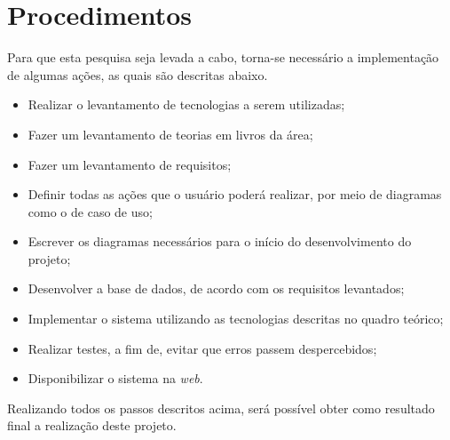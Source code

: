 \section{Procedimentos}

\par Para que esta pesquisa seja levada a cabo, torna-se necessário a implementação de algumas ações, as quais são descritas abaixo.

\begin{itemize}
	\item Realizar o levantamento de tecnologias a serem utilizadas;
	\item Fazer um levantamento de teorias em livros da área;
	\item Fazer um levantamento de requisitos;
	\item Definir todas as ações que o usuário poderá realizar, por meio de diagramas como o de caso de uso;
	\item Escrever os diagramas necessários para o início do desenvolvimento do projeto;
	\item Desenvolver a base de dados, de acordo com os requisitos levantados;
	\item Implementar o sistema utilizando as tecnologias descritas no quadro teórico;
	\item Realizar testes, a fim de, evitar que erros passem despercebidos;
	\item Disponibilizar o sistema na \textit{web}.
\end{itemize}

\par Realizando todos os passos descritos acima, será possível obter como resultado final a realização deste projeto.





